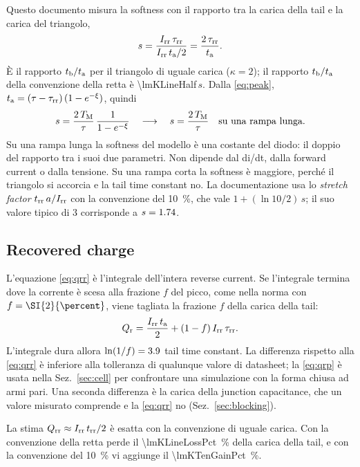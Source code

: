 \documentclass[10pt,a4paper]{scrartcl}
\let\newcommand\pdvaluedefine
\newcommand{\Irr}{I_\mathrm{rr}}
\newcommand{\Qrr}{Q_\mathrm{rr}}
\newcommand{\trr}{t_\mathrm{rr}}
\newcommand{\ta}{t_\mathrm{a}}
\newcommand{\tb}{t_\mathrm{b}}
\newcommand{\taurr}{\tau_\mathrm{rr}}
\newcommand{\TM}{T_\mathrm{M}}
\begin{document}
Questo documento misura la softness con il rapporto tra la carica della tail e la carica del triangolo,
\begin{equation}
s = \frac{\Irr\,\taurr}{\Irr\,\ta/2} = \frac{2\,\taurr}{\ta} .
\label{eq:soft}
\end{equation}
È il rapporto $\tb/\ta$ per il triangolo di uguale carica ($\kappa = 2$); il rapporto $\tb/\ta$ della convenzione della retta è \num{\lmKLineHalf}\,$s$. Dalla \eqref{eq:peak}, $\ta = (\tau-\taurr)\,(1-e^{-\xi})$, quindi
\begin{equation}
s = \frac{2\,\TM}{\tau}\,\frac{1}{1-e^{-\xi}} \quad\longrightarrow\quad s = \frac{2\,\TM}{\tau} \quad \text{su una rampa lunga.}
\label{eq:softlong}
\end{equation}
Su una rampa lunga la softness del modello è una costante del diodo: il doppio del rapporto tra i suoi due parametri. Non dipende dal di/dt, dalla forward current o dalla tensione. Su una rampa corta la softness è maggiore, perché il triangolo si accorcia e la tail time constant no. La documentazione \cite{mathworks} usa lo \emph{stretch factor} $\trr\,a/\Irr$ con la convenzione del \SI{10}{\percent}, che vale $1 + (\ln 10/2)\,s$; il suo valore tipico di 3 corrisponde a $s = 1.74$.

\subsection{Recovered charge}
L'equazione \eqref{eq:qrr} è l'integrale dell'intera reverse current. Se l'integrale termina dove la corrente è scesa alla frazione $f$ del picco, come nella norma con $f = \SI{\lmPEndPct}{\percent}$, viene tagliata la frazione $f$ della carica della tail:
\begin{equation}
Q_\mathrm{r} = \frac{\Irr\,\ta}{2} + (1-f)\,\Irr\,\taurr .
\label{eq:qrp}
\end{equation}
L'integrale dura allora $\ln(1/f) = 3.9$ tail time constant. La differenza rispetto alla \eqref{eq:qrr} è inferiore alla tolleranza di qualunque valore di datasheet; la \eqref{eq:qrp} è usata nella Sez.~\ref{sec:cell} per confrontare una simulazione con la forma chiusa ad armi pari. Una seconda differenza è la carica della junction capacitance, che un valore misurato comprende e la \eqref{eq:qrr} no (Sez.~\ref{sec:blocking}).

La stima $\Qrr \approx \Irr\,\trr/2$ è esatta con la convenzione di uguale carica. Con la convenzione della retta perde il \SI{\lmKLineLossPct}{\percent} della carica della tail, e con la convenzione del \SI{10}{\percent} vi aggiunge il \SI{\lmKTenGainPct}{\percent}.
\end{document}
